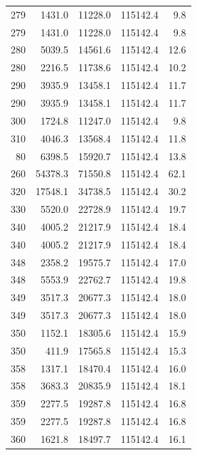 \begin{longtable}{rrrrr}
    279 & \num{1431.0} & \num{11228.0} & \num{115142.4} & 9.8 \\
    279 & \num{1431.0} & \num{11228.0} & \num{115142.4} & 9.8 \\
    280 & \num{5039.5} & \num{14561.6} & \num{115142.4} & 12.6 \\
    280 & \num{2216.5} & \num{11738.6} & \num{115142.4} & 10.2 \\
    290 & \num{3935.9} & \num{13458.1} & \num{115142.4} & 11.7 \\
    290 & \num{3935.9} & \num{13458.1} & \num{115142.4} & 11.7 \\
    300 & \num{1724.8} & \num{11247.0} & \num{115142.4} & 9.8 \\
    310 & \num{4046.3} & \num{13568.4} & \num{115142.4} & 11.8 \\
    80 & \num{6398.5} & \num{15920.7} & \num{115142.4} & 13.8 \\
    260 & \num{54378.3} & \num{71550.8} & \num{115142.4} & 62.1 \\
    320 & \num{17548.1} & \num{34738.5} & \num{115142.4} & 30.2 \\
    330 & \num{5520.0} & \num{22728.9} & \num{115142.4} & 19.7 \\
    340 & \num{4005.2} & \num{21217.9} & \num{115142.4} & 18.4 \\
    340 & \num{4005.2} & \num{21217.9} & \num{115142.4} & 18.4 \\
    348 & \num{2358.2} & \num{19575.7} & \num{115142.4} & 17.0 \\
    348 & \num{5553.9} & \num{22762.7} & \num{115142.4} & 19.8 \\
    349 & \num{3517.3} & \num{20677.3} & \num{115142.4} & 18.0 \\
    349 & \num{3517.3} & \num{20677.3} & \num{115142.4} & 18.0 \\
    350 & \num{1152.1} & \num{18305.6} & \num{115142.4} & 15.9 \\
    350 & \num{411.9} & \num{17565.8} & \num{115142.4} & 15.3 \\
    358 & \num{1317.1} & \num{18470.4} & \num{115142.4} & 16.0 \\
    358 & \num{3683.3} & \num{20835.9} & \num{115142.4} & 18.1 \\
    359 & \num{2277.5} & \num{19287.8} & \num{115142.4} & 16.8 \\
    359 & \num{2277.5} & \num{19287.8} & \num{115142.4} & 16.8 \\
    360 & \num{1621.8} & \num{18497.7} & \num{115142.4} & 16.1 \\

\end{longtable}
